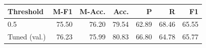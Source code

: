 \begin{tabular}{lrrrrrr}
\toprule
Threshold & M-F1 & M-Acc. & Acc. & P & R & F1 \\
\midrule
0.5 & 75.50 & 76.20 & 79.54 & 62.89 & 68.46 & 65.55 \\
Tuned (val.) & 76.23 & 75.99 & 80.83 & 66.80 & 64.78 & 65.77 \\
\bottomrule
\end{tabular}

